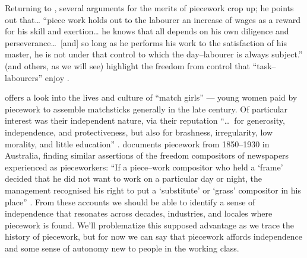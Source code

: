 \documentclass[trackingWork]{subfiles}
\begin{document}
Returning to
\citeauthor{hughRaynbirdTaskWork}, several arguments for the merits of piecework
crop up; he points out that\dots
``piece work holds out to the labourer an increase of wages as a reward for his skill and exertion\dots
he knows that all depends on his own diligence and perseverance\dots~[and]
so long as he performs his work to the satisfaction of his master,
he is not under that control to which the day--labourer is always subject.''
\citeauthor{hughRaynbirdTaskWork} (and others, as we will see)
highlight the freedom from control that ``task--labourers'' enjoy
\cite{hughRaynbirdTaskWork,rowan1901premium}.

\citeauthor{10.2307/3827491} offers a look into the lives and culture of ``match girls''
--- young women paid by piecework to assemble matchsticks generally in the late  century.
Of particular interest was their independent nature, via their reputation ``\dots~for generosity, independence, and protectiveness,
but also for brashness, irregularity, low morality, and little education''
\cite{10.2307/3827491}.
\citeauthor{10.2307/27508091} documents piecework from 1850--1930 in Australia,
finding similar assertions of the freedom compositors of newspapers experienced as pieceworkers:
``If a piece--work compositor who held a `frame' decided that he did not want to work on a particular day or night,
the management recognised his right to put a `substitute' or `grass' compositor in his place''
\cite{10.2307/27508091}.
From these accounts we should be able to identify
a sense of independence that
resonates across decades, industries, and locales where piecework is found.
We'll problematize this supposed advantage as we trace the history of piecework,
but for now we can say that piecework affords
independence and some sense of autonomy
new to people in the working class.
\end{document}
